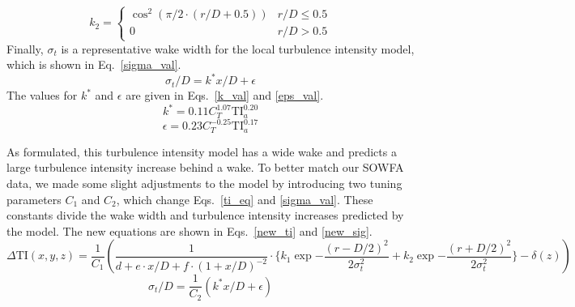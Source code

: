 \documentclass[11pt,letterpaper]{article}
\begin{document}
%
\begin{equation}
    \label{k2_val}
    k_2 = \begin{cases} 
      \cos^2{(\pi/2 \cdot (r/D + 0.5))} & r/D \leq 0.5 \\
      0 & r/D > 0.5
   \end{cases}
\end{equation}
% 
Finally, $\sigma_t$ is a representative wake width for the local turbulence intensity model, which is shown in Eq.~\ref{sigma_val}.
%
\begin{equation}
    \label{sigma_val}
    \sigma_t/D = k^* x/D + \epsilon
\end{equation}
% 
The values for $k^*$ and $\epsilon$ are given in Eqs.~\ref{k_val} and \ref{eps_val}.
%
\begin{equation}
    \label{k_val}
    k^* = 0.11 C_T^{1.07} \text{TI}_a ^ {0.20}
\end{equation}
%
\begin{equation}
    \label{eps_val}
    \epsilon = 0.23 C_T^{-0.25} \text{TI}_a^{0.17}
\end{equation}

As formulated, this turbulence intensity model has a wide wake and predicts a large turbulence intensity increase behind a wake.
To better match our SOWFA data, we made some slight adjustments to the model by introducing two tuning parameters $C_1$ and $C_2$, which change Eqs.~\ref{ti_eq} and \ref{sigma_val}. These constants divide the wake width and turbulence intensity increases predicted by the model. The new equations are shown in Eqs.~\ref{new_ti} and \ref{new_sig}.
% 
\begin{equation}
    \label{new_ti}
    \Delta \text{TI}(x,y,z) = \frac{1}{C_1}(\frac{1}{d + e \cdot x/D + f\cdot(1+x/D)^{-2}} \cdot \Big\{k_1 \exp{-\frac{(r-D/2)^2}{2\sigma_t^2}} + k_2 \exp{-\frac{(r+D/2)^2}{2\sigma_t^2}} \Big\} - \delta(z))
\end{equation}
%
\begin{equation}
    \label{new_sig}
    \sigma_t/D = \frac{1}{C_2}(k^* x/D + \epsilon)
\end{equation}
\end{document}
